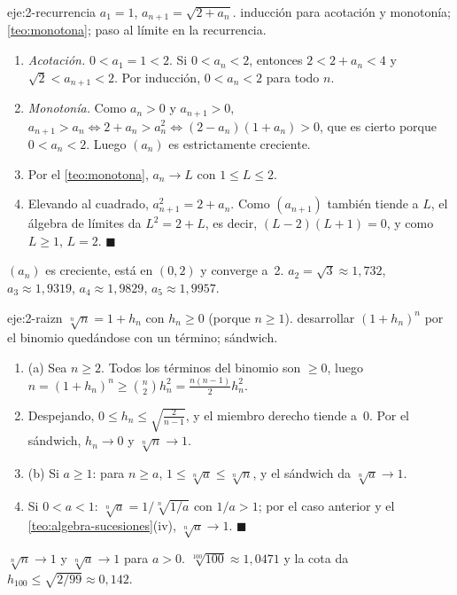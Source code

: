 \begin{solucion}{eje:2-recurrencia}
\datos $a_1=1$, $a_{n+1}=\sqrt{2+a_n}$.
\planteamiento inducción para acotación y monotonía; \cref{teo:monotona}; paso al límite en la recurrencia.
\pasos
\begin{enumerate}[label=\arabic*.]
  \item \emph{Acotación.} $0<a_1=1<2$. Si $0<a_n<2$, entonces $2<2+a_n<4$ y $\sqrt2<a_{n+1}<2$. Por inducción, $0<a_n<2$ para todo $n$.
  \item \emph{Monotonía.} Como $a_n>0$ y $a_{n+1}>0$, $a_{n+1}>a_n\iff2+a_n>a_n^{2}\iff(2-a_n)(1+a_n)>0$, que es cierto porque $0<a_n<2$. Luego $(a_n)$ es estrictamente creciente.
  \item Por el \cref{teo:monotona}, $a_n\to L$ con $1\le L\le2$.
  \item Elevando al cuadrado, $a_{n+1}^{2}=2+a_n$. Como $(a_{n+1})$ también tiende a $L$, el álgebra de límites da $L^{2}=2+L$, es decir, $(L-2)(L+1)=0$, y como $L\ge1$, $L=2$. \hfill$\blacksquare$
\end{enumerate}
\resultado $(a_n)$ es creciente, está en $(0,2)$ y converge a~2.
\comprobacion $a_2=\sqrt3\approx1{,}732$, $a_3\approx1{,}9319$, $a_4\approx1{,}9829$, $a_5\approx1{,}9957$.
\end{solucion}

\begin{solucion}{eje:2-raizn}
\datos $\sqrt[n]{n}=1+h_n$ con $h_n\ge0$ (porque $n\ge1$).
\planteamiento desarrollar $(1+h_n)^{n}$ por el binomio quedándose con un término; sándwich.
\pasos
\begin{enumerate}[label=\arabic*.]
  \item (a) Sea $n\ge2$. Todos los términos del binomio son $\ge0$, luego $n=(1+h_n)^{n}\ge\binom n2h_n^{2}=\frac{n(n-1)}{2}h_n^{2}$.
  \item Despejando, $0\le h_n\le\sqrt{\frac{2}{n-1}}$, y el miembro derecho tiende a~0. Por el sándwich, $h_n\to0$ y $\sqrt[n]n\to1$.
  \item (b) Si $a\ge1$: para $n\ge a$, $1\le\sqrt[n]a\le\sqrt[n]n$, y el sándwich da $\sqrt[n]a\to1$.
  \item Si $0<a<1$: $\sqrt[n]a=1/\sqrt[n]{1/a}$ con $1/a>1$; por el caso anterior y el \cref{teo:algebra-sucesiones}(iv), $\sqrt[n]a\to1$. \hfill$\blacksquare$
\end{enumerate}
\resultado $\sqrt[n]n\to1$ y $\sqrt[n]a\to1$ para $a>0$.
\comprobacion $\sqrt[100]{100}\approx1{,}0471$ y la cota da $h_{100}\le\sqrt{2/99}\approx0{,}142$.
\end{solucion}


